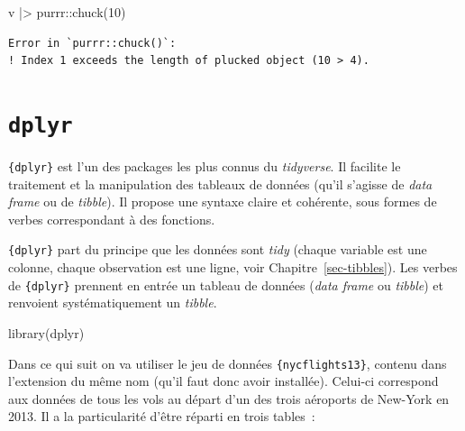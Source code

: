 \documentclass[
  letterpaper,
  DIV=11,
  numbers=noendperiod,
  oneside]{scrreprt}
\newenvironment{Shaded}{\begin{snugshade}}{\end{snugshade}}
\newcommand{\DecValTok}[1]{\textcolor[rgb]{0.68,0.00,0.00}{#1}}
\newcommand{\FunctionTok}[1]{\textcolor[rgb]{0.28,0.35,0.67}{#1}}
\newcommand{\NormalTok}[1]{\textcolor[rgb]{0.00,0.23,0.31}{#1}}
\newcommand{\SpecialCharTok}[1]{\textcolor[rgb]{0.37,0.37,0.37}{#1}}
\begin{document}
\begin{Shaded}
\begin{Highlighting}[]
\NormalTok{v }\SpecialCharTok{|\textgreater{}}\NormalTok{ purrr}\SpecialCharTok{::}\FunctionTok{chuck}\NormalTok{(}\DecValTok{10}\NormalTok{)}
\end{Highlighting}
\end{Shaded}

\begin{verbatim}
Error in `purrr::chuck()`:
! Index 1 exceeds the length of plucked object (10 > 4).
\end{verbatim}

\hypertarget{sec-dplyr}{%
\chapter{\texorpdfstring{\texttt{dplyr}}{dplyr}}\label{sec-dplyr}}

\texttt{\{dplyr\}} est l'un des packages les plus connus du
\emph{tidyverse}. Il facilite le traitement et la manipulation des
tableaux de données (qu'il s'agisse de \emph{data frame} ou de
\emph{tibble}). Il propose une syntaxe claire et cohérente, sous formes
de verbes correspondant à des fonctions.

\texttt{\{dplyr\}} part du principe que les données sont \emph{tidy}
(chaque variable est une colonne, chaque observation est une ligne, voir
Chapitre~\ref{sec-tibbles}). Les verbes de \texttt{\{dplyr\}} prennent
en entrée un tableau de données (\emph{data frame} ou
\emph{tibble}) et renvoient systématiquement un \emph{tibble}.

\begin{Shaded}
\begin{Highlighting}[]
\FunctionTok{library}\NormalTok{(dplyr)}
\end{Highlighting}
\end{Shaded}

Dans ce qui suit on va utiliser le jeu de données
\texttt{\{nycflights13\}}, contenu dans l'extension du même nom (qu'il
faut donc avoir installée). Celui-ci correspond aux données de tous les
vols au départ d'un des trois aéroports de New-York en 2013. Il a la
particularité d'être réparti en trois tables~:
\end{document}
